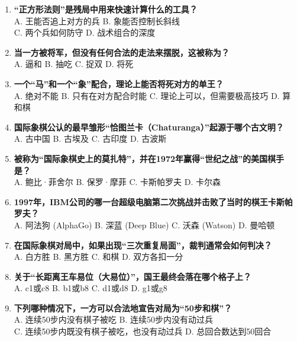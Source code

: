 \documentclass[a4paper, 11pt]{ctexart}
\begin{document}
\begin{enumerate}[label=\arabic*., itemsep=1.5em]
    \item \textbf{“正方形法则”是残局中用来快速计算什么的工具？} \\
    A. 王能否追上对方的兵 \qquad B. 象能否控制长斜线 \\
    C. 两个兵如何防守 \qquad D. 战术组合的深度

    \item \textbf{当一方被将军，但没有任何合法的走法来摆脱，这被称为？} \\
    A. 逼和 \qquad B. 抽吃 \qquad C. 捉双 \qquad D. 将死

    \item \textbf{一个“马”和一个“象”配合，理论上能否将死对方的单王？} \\
    A. 绝对不能 \qquad B. 只有在对方配合时能 \qquad C. 理论上可以，但需要极高技巧 \qquad D. 算和棋

    \item \textbf{国际象棋公认的最早雏形“恰图兰卡（Chaturanga）”起源于哪个古文明？} \\
    A. 古中国 \qquad B. 古埃及 \qquad C. 古印度 \qquad D. 古波斯

    \item \textbf{被称为“国际象棋史上的莫扎特”，并在1972年赢得“世纪之战”的美国棋手是？} \\
    A. 鲍比·菲舍尔 \qquad B. 保罗·摩菲 \qquad C. 卡斯帕罗夫 \qquad D. 卡尔森

    \item \textbf{1997年，IBM公司的哪一台超级电脑第二次挑战并击败了当时的棋王卡斯帕罗夫？} \\
    A. 阿法狗 (AlphaGo) \qquad B. 深蓝 (Deep Blue) \qquad C. 沃森 (Watson) \qquad D. 曼哈顿

\item \textbf{在国际象棋对局中，如果出现“三次重复局面”，裁判通常会如何判决？} \\
    A. 白方胜 \qquad B. 黑方胜 \qquad C. 和棋 \qquad D. 双方各扣一分

    \item \textbf{关于“长距离王车易位（大易位）”，国王最终会落在哪个格子上？} \\
    A. c1或c8 \qquad B. b1或b8 \qquad C. d1或d8 \qquad D. g1或g8

    \item \textbf{下列哪种情况下，一方可以合法地宣告对局为“50步和棋”？} \\
    A. 连续50步内没有棋子被吃 \quad B. 连续50步内没有动过兵 \\
    C. 连续50步内既没有棋子被吃，也没有动过兵 \quad D. 总回合数达到50回合


\end{enumerate}
\end{document}
